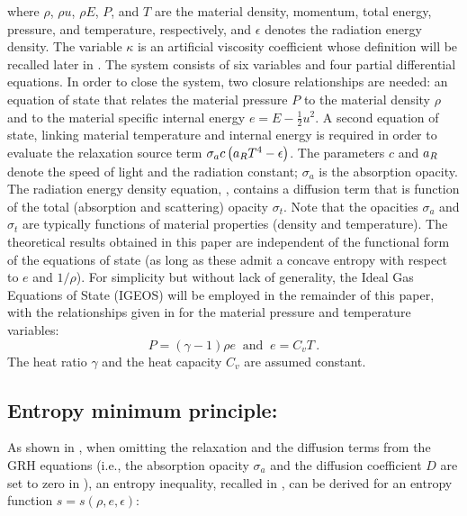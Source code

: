 \documentclass[times,doublespace]{fldauth}%
\begin{document}
%
where $\rho$, $\rho u$, $\rho E$, $P$, and $T$ are the material density, momentum, total energy, pressure, and temperature, respectively, and $\epsilon$ denotes the radiation energy density. The variable $\kappa$ is an artificial viscosity coefficient whose definition will be recalled  later in .
The system consists of six variables and four partial differential equations. In order to close the system, two closure relationships are needed:  
an equation of state that relates the material pressure $P$ to the material density $\rho$ and to the 
material specific internal energy $e = E - \tfrac 1 2 u^2$. A second equation of state, linking material temperature 
and internal energy is required in order to evaluate the relaxation source term $\sigma_a c \left( a_R T^4 - \epsilon \right)$.
The parameters $c$ and $a_R$ denote the speed of light and the radiation constant; $\sigma_a$ is the absorption opacity. 
The radiation energy density equation, , contains a diffusion term that is function of the 
total (absorption and scattering) opacity $\sigma_t$. Note that the opacities $\sigma_a$ and $\sigma_t$ are typically functions of 
material properties (density and temperature). 
The theoretical results obtained in this paper are independent of the functional form of the equations of state 
(as long as these admit a concave entropy with respect to $e$ and $1/ \rho$). For simplicity but without lack of generality, the Ideal Gas Equations of State
(IGEOS) will be employed in the remainder of this paper, with the relationships given in  for the material pressure and temperature variables:
%
\begin{equation}\label{eq:IGEOS}
P = (\gamma-1) \rho e \ \text{  and  } \ e = C_v T \, .
\end{equation}
%
The heat ratio $\gamma$ and the heat capacity $C_v$ are assumed constant.
%
\subsection{Entropy minimum principle:}\label{sec:ent-min}
%
As shown in \cite{our_jcp_radhy_paper}, when omitting the relaxation and the diffusion terms from the GRH equations (i.e., the absorption opacity $\sigma_a$ and the diffusion coefficient $D$ are set to zero in ), an entropy inequality, recalled in , can be derived for an entropy function $s=s(\rho, e, \epsilon)$:
\end{document}
